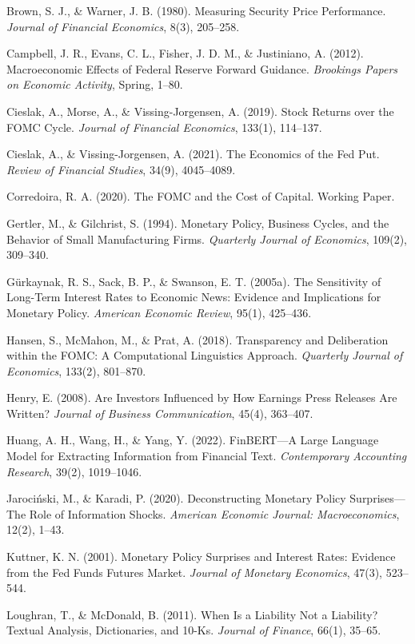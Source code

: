 \documentclass[12pt]{article}
\begin{document}
Brown, S. J., \& Warner, J. B. (1980). Measuring Security Price
Performance. \emph{Journal of Financial Economics}, 8(3), 205--258.

Campbell, J. R., Evans, C. L., Fisher, J. D. M., \& Justiniano, A.
(2012). Macroeconomic Effects of Federal Reserve Forward Guidance.
\emph{Brookings Papers on Economic Activity}, Spring, 1--80.

Cieslak, A., Morse, A., \& Vissing-Jorgensen, A. (2019). Stock Returns
over the FOMC Cycle. \emph{Journal of Financial Economics}, 133(1),
114--137.

Cieslak, A., \& Vissing-Jorgensen, A. (2021). The Economics of the Fed
Put. \emph{Review of Financial Studies}, 34(9), 4045--4089.

Corredoira, R. A. (2020). The FOMC and the Cost of Capital. Working
Paper.

Gertler, M., \& Gilchrist, S. (1994). Monetary Policy, Business Cycles,
and the Behavior of Small Manufacturing Firms. \emph{Quarterly Journal
of Economics}, 109(2), 309--340.

Gürkaynak, R. S., Sack, B. P., \& Swanson, E. T. (2005a). The
Sensitivity of Long-Term Interest Rates to Economic News: Evidence and
Implications for Monetary Policy. \emph{American Economic Review},
95(1), 425--436.

Hansen, S., McMahon, M., \& Prat, A. (2018). Transparency and
Deliberation within the FOMC: A Computational Linguistics Approach.
\emph{Quarterly Journal of Economics}, 133(2), 801--870.

Henry, E. (2008). Are Investors Influenced by How Earnings Press
Releases Are Written? \emph{Journal of Business Communication}, 45(4),
363--407.

Huang, A. H., Wang, H., \& Yang, Y. (2022). FinBERT---A Large Language
Model for Extracting Information from Financial Text. \emph{Contemporary
Accounting Research}, 39(2), 1019--1046.

Jarociński, M., \& Karadi, P. (2020). Deconstructing Monetary Policy
Surprises---The Role of Information Shocks. \emph{American Economic
Journal: Macroeconomics}, 12(2), 1--43.

Kuttner, K. N. (2001). Monetary Policy Surprises and Interest Rates:
Evidence from the Fed Funds Futures Market. \emph{Journal of Monetary
Economics}, 47(3), 523--544.

Loughran, T., \& McDonald, B. (2011). When Is a Liability Not a
Liability? Textual Analysis, Dictionaries, and 10-Ks. \emph{Journal of
Finance}, 66(1), 35--65.
\end{document}
